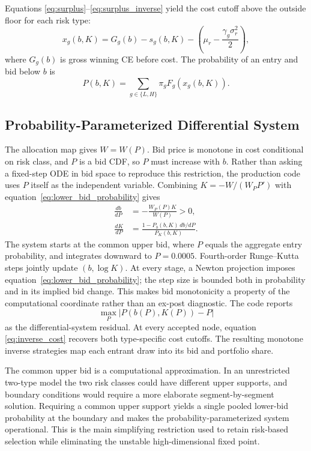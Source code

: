 \documentclass[10pt]{article}
\begin{document}
Equations \eqref{eq:surplus}--\eqref{eq:surplus_inverse} yield the cost cutoff
above the outside floor for each risk type:
\begin{equation}
x_g(b,K)
=G_g(b)-s_g(b,K)
-\left(\mu_r-\frac{\gamma_g\sigma_r^2}{2}\right),
\label{eq:inverse_cost}
\end{equation}
where $G_g(b)$ is gross winning CE before cost.  The probability of an entry
and bid below $b$ is
\begin{equation}
P(b,K)=\sum_{g\in\{L,H\}}\pi_gF_g(x_g(b,K)).
\label{eq:lower_bid_probability}
\end{equation}

\subsection{Probability-Parameterized Differential System}

The allocation map gives $W=W(P)$.  Bid price is monotone in cost conditional
on risk class, and $P$ is a bid CDF, so $P$ must increase with $b$.  Rather
than asking a fixed-step ODE in bid space to reproduce this restriction, the
production code uses $P$ itself as the independent variable.  Combining
$K=-W/(W_PP')$ with equation~\eqref{eq:lower_bid_probability} gives
\begin{align}
\frac{db}{dP}
&=-\frac{W_P(P)K}{W(P)}>0,
\label{eq:bid_probability_ode}\\
\frac{dK}{dP}
&=\frac{1-P_b(b,K)\,db/dP}{P_K(b,K)}.
\label{eq:K_probability_ode}
\end{align}
The system starts at the common upper bid, where $P$ equals the aggregate
entry probability, and integrates downward to $P=0.0005$.  Fourth-order
Runge--Kutta steps jointly update $(b,\log K)$.  At every stage, a Newton
projection imposes equation~\eqref{eq:lower_bid_probability}; the step size is
bounded both in probability and in its implied bid change.  This makes bid
monotonicity a property of the computational coordinate rather than an
ex-post diagnostic.  The code reports
\begin{equation}
\max_P\left|P(b(P),K(P))-P\right|
\label{eq:probability_ode_residual}
\end{equation}
as the differential-system residual.  At every accepted node, equation
\eqref{eq:inverse_cost} recovers both type-specific cost cutoffs.  The
resulting monotone inverse strategies map each entrant draw into its bid and
portfolio share.

The common upper bid is a computational approximation.  In an unrestricted
two-type model the two risk classes could have different upper supports, and
boundary conditions would require a more elaborate segment-by-segment
solution.  Requiring a common upper support yields a single pooled lower-bid
probability at the boundary and makes the probability-parameterized system
operational.  This is the main simplifying restriction used to retain
risk-based selection while
eliminating the unstable high-dimensional fixed point.
\end{document}
